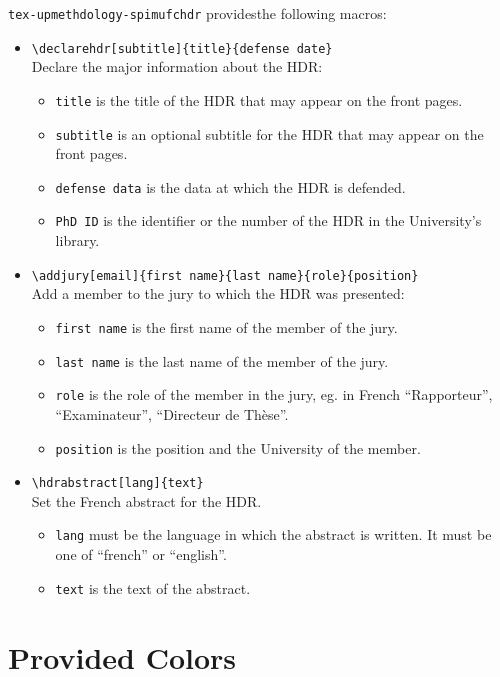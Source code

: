\documentclass[article,english]{upmethodology-document}
\begin{document}
\texttt{tex-upmethdology-spimufchdr} providesthe following macros:
\begin{itemize}
\item \texttt{{\textbackslash}declarehdr[subtitle]\{title\}\{defense date\}} \\
	Declare the major information about the HDR:
	\begin{itemize}
	\item \texttt{title} is the title of the HDR that may appear on the front pages.
	\item \texttt{subtitle} is an optional subtitle for the HDR that may appear on the front pages.
	\item \texttt{defense data} is the data at which the HDR is defended.
	\item \texttt{PhD ID} is the identifier or the number of the HDR in the University's library.
	\end{itemize}
\item \texttt{{\textbackslash}addjury[email]\{first name\}\{last name\}\{role\}\{position\}} \\
	Add a member to the jury to which the HDR was presented:
	\begin{itemize}
	\item \texttt{first name} is the first name of the member of the jury.
	\item \texttt{last name} is the last name of the member of the jury.
	\item \texttt{role} is the role of the member in the jury, eg. in French ``Rapporteur'', ``Examinateur'', ``Directeur de Th\`ese''.
	\item \texttt{position} is the position and the University of the member.
	\end{itemize}
\item \texttt{{\textbackslash}hdrabstract[lang]\{text\}} \\
	Set the French abstract for the HDR.
	\begin{itemize}
	\item \texttt{lang} must be the language in which the abstract is written. It must be one of ``french'' or ``english''.
	\item \texttt{text} is the text of the abstract.
	\end{itemize}
\end{itemize}

\section{Provided Colors}
\end{document}
